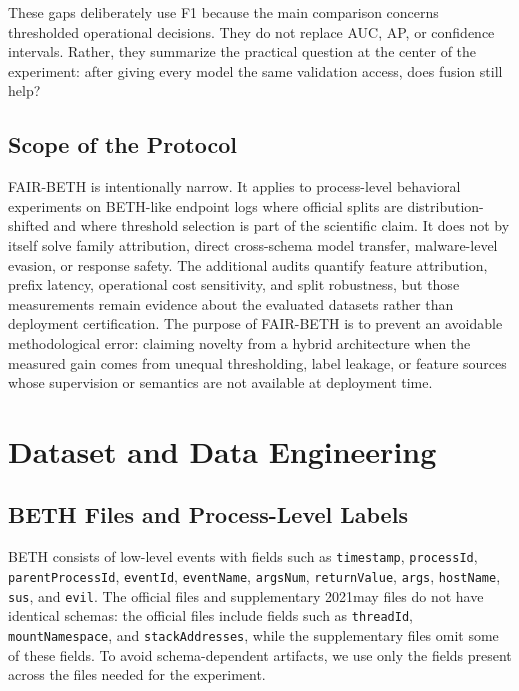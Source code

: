 \documentclass[journal]{IEEEtran}
\begin{document}
These gaps deliberately use F1 because the main comparison concerns thresholded operational decisions. They do not replace AUC, AP, or confidence intervals. Rather, they summarize the practical question at the center of the experiment: after giving every model the same validation access, does fusion still help?

\subsection{Scope of the Protocol}

FAIR-BETH is intentionally narrow. It applies to process-level behavioral experiments on BETH-like endpoint logs where official splits are distribution-shifted and where threshold selection is part of the scientific claim. It does not by itself solve family attribution, direct cross-schema model transfer, malware-level evasion, or response safety. The additional audits quantify feature attribution, prefix latency, operational cost sensitivity, and split robustness, but those measurements remain evidence about the evaluated datasets rather than deployment certification. The purpose of FAIR-BETH is to prevent an avoidable methodological error: claiming novelty from a hybrid architecture when the measured gain comes from unequal thresholding, label leakage, or feature sources whose supervision or semantics are not available at deployment time.

\section{Dataset and Data Engineering}
\label{sec:data}

\subsection{BETH Files and Process-Level Labels}

BETH consists of low-level events with fields such as \texttt{timestamp}, \texttt{processId}, \texttt{parentProcessId}, \texttt{eventId}, \texttt{eventName}, \texttt{argsNum}, \texttt{returnValue}, \texttt{args}, \texttt{hostName}, \texttt{sus}, and \texttt{evil}. The official files and supplementary 2021may files do not have identical schemas: the official files include fields such as \texttt{threadId}, \texttt{mountNamespace}, and \texttt{stackAddresses}, while the supplementary files omit some of these fields. To avoid schema-dependent artifacts, we use only the fields present across the files needed for the experiment.
\end{document}
